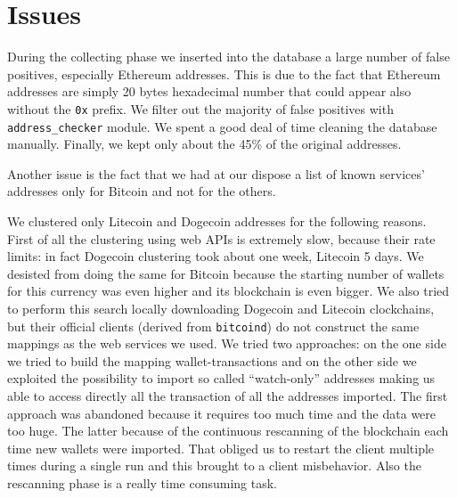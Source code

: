 \section{Issues} \label{sec:issues}
During the collecting phase we inserted into the database a large number of
false positives, especially Ethereum addresses. This is due to the fact that
Ethereum addresses are simply 20 bytes hexadecimal number that could appear
also without the \texttt{0x} prefix. We filter out the majority of false
positives with \texttt{address\_checker} module. We spent a good deal of time
cleaning the database manually. Finally, we kept only about the 45\% of the
original addresses. 

Another issue is the fact that we had at our dispose a list of known services'
addresses only for Bitcoin and not for the others.

We clustered only Litecoin and Dogecoin addresses for the following reasons.
First of all the clustering using web APIs is extremely slow, because their
rate limits: in fact Dogecoin clustering took about one week, Litecoin 5 days.
We desisted from doing the same for Bitcoin because the starting number of
wallets for this currency was even higher and its blockchain is even bigger. We
also tried to perform this search locally downloading Dogecoin and Litecoin
clockchains, but their official clients (derived from \texttt{bitcoind}) do not
construct the same mappings as the web services we used. We tried two
approaches: on the one side we tried to build the mapping wallet-transactions
and on the other side we exploited the possibility to import so called
``watch-only'' addresses making us able to access directly all the transaction
of all the addresses imported. The first approach was abandoned because it
requires too much time and the data were too huge. The latter because of the
continuous rescanning of the blockchain each time new wallets were imported.
That obliged us to restart the client multiple times during a single run and
this brought to a client misbehavior. Also the rescanning phase is a really
time consuming task.

